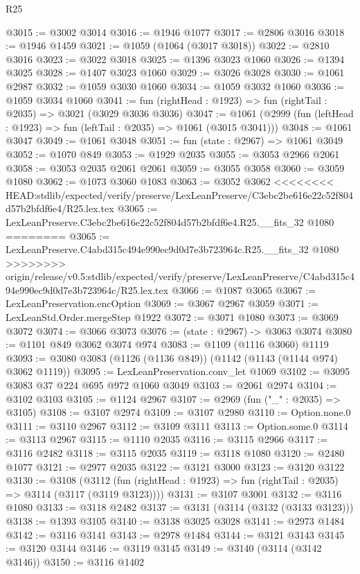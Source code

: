 \begin{lexlean}{R25}
\begin{coremodule}
{{{{{{{{{{{{{{{{{{{{{{{{{{{{{{{{{{{{{{{{{{{{{{{{{{{{{@3015 := @3002 @3014
@3016 := @1946 @1077
@3017 := @2806 @3016
@3018 := @1946 @1459
@3021 := @1059 (@1064 (@3017 @3018))
@3022 := @2810 @3016
@3023 := @3022 @3018
@3025 := @1396 @3023 @1060
@3026 := @1394 @3025
@3028 := @1407 @3023 @1060
@3029 := @3026 @3028
@3030 := @1061 @2987
@3032 := @1059 @3030 @1060
@3034 := @1059 @3032 @1060
@3036 := @1059 @3034 @1060
@3041 := fun (rightHead : @1923) => fun (rightTail : @2035) => @3021 (@3029 @3036 @3036)
@3047 := @1061 (@2999 (fun (leftHead : @1923) => fun (leftTail : @2035) => @1061 (@3015 @3041)))
@3048 := @1061 @3047
@3049 := @1061 @3048
@3051 := fun (state : @2967) => @1061 @3049
@3052 := @1070 @849
@3053 := @1929 @2035
@3055 := @3053 @2966 @2061
@3058 := @3053 @2035 @2061 @2061
@3059 := @3055 @3058
@3060 := @3059 @1080
@3062 := @1073 @3060 @1083
@3063 := @3052 @3062
<<<<<<<< HEAD:stdlib/expected/verify/preserve/LexLeanPreserve/C3ebc2be616e22c52f804d57b2bfdf6e4/R25.lex.tex
@3065 := LexLeanPreserve.C3ebc2be616e22c52f804d57b2bfdf6e4.R25.__fits_32 @1080
========
@3065 := LexLeanPreserve.C4abd315c494e990ec9d0d7e3b723964c.R25.__fits_32 @1080
>>>>>>>> origin/release/v0.5:stdlib/expected/verify/preserve/LexLeanPreserve/C4abd315c494e990ec9d0d7e3b723964c/R25.lex.tex
@3066 := @1087 @3065
@3067 := LexLeanPreservation.encOption
@3069 := @3067 @2967 @3059
@3071 := LexLeanStd.Order.mergeStep @1922
@3072 := @3071 @1080
@3073 := @3069 @3072
@3074 := @3066 @3073
@3076 := (state : @2967) -> @3063 @3074
@3080 := @1101 @849 @3062 @3074 @974
@3083 := @1109 (@1116 @3060) @1119
@3093 := @3080 @3083 (@1126 (@1136 @849)) (@1142 (@1143 (@1144 @974) @3062 @1119))
@3095 := LexLeanPreservation.conv_let @1069
@3102 := @3095 @3083 @37 @224 @695 @972 @1060 @3049
@3103 := @2061 @2974
@3104 := @3102 @3103
@3105 := @1124 @2967
@3107 := @2969 (fun ("_" : @2035) => @3105)
@3108 := @3107 @2974
@3109 := @3107 @2980
@3110 := Option.none.{0}
@3111 := @3110 @2967
@3112 := @3109 @3111
@3113 := Option.some.{0}
@3114 := @3113 @2967
@3115 := @1110 @2035
@3116 := @3115 @2966
@3117 := @3116 @2482
@3118 := @3115 @2035
@3119 := @3118 @1080
@3120 := @2480 @1077
@3121 := @2977 @2035
@3122 := @3121 @3000
@3123 := @3120 @3122
@3130 := @3108
    (@3112 (fun (rightHead : @1923) => fun (rightTail : @2035) => @3114 (@3117 (@3119 @3123))))
@3131 := @3107 @3001
@3132 := @3116 @1080
@3133 := @3118 @2482
@3137 := @3131 (@3114 (@3132 (@3133 @3123)))
@3138 := @1393 @3105
@3140 := @3138 @3025 @3028
@3141 := @2973 @1484
@3142 := @3116 @3141
@3143 := @2978 @1484
@3144 := @3121 @3143
@3145 := @3120 @3144
@3146 := @3119 @3145
@3149 := @3140 (@3114 (@3142 @3146))
@3150 := @3116 @1402
}}}}}}}}}}}}}}}}}}}}}}}}}}}}}}}}}}}}}}}}}}}}}}}}}}}}}
\end{coremodule}
\end{lexlean}
